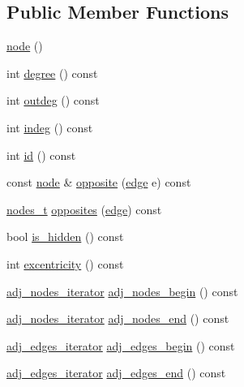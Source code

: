 \subsection*{Public Member Functions}
\begin{DoxyCompactItemize}
\item 
\mbox{\hyperlink{classnode_a6da4ea35f222059db9a59cf40be459f9}{node}} ()
\item 
int \mbox{\hyperlink{classnode_a1e5e94e426da180a069cf307616e38e3}{degree}} () const
\item 
int \mbox{\hyperlink{classnode_a32adc45c4132e2642ccd2233d79ffe67}{outdeg}} () const
\item 
int \mbox{\hyperlink{classnode_a749bfd1316584b96f8c9b0e44ad512f0}{indeg}} () const
\item 
int \mbox{\hyperlink{classnode_a5d38b4152c3cedb235e45de7eb3f4469}{id}} () const
\item 
const \mbox{\hyperlink{classnode}{node}} \& \mbox{\hyperlink{classnode_a13dbd1809a33a5efede64a359e53a363}{opposite}} (\mbox{\hyperlink{classedge}{edge}} e) const
\item 
\mbox{\hyperlink{edge_8h_a22ac17689106ba21a84e7bc54d1199d6}{nodes\+\_\+t}} \mbox{\hyperlink{classnode_a63b5d884763b0ed9a8c2c595d9cf060d}{opposites}} (\mbox{\hyperlink{classedge}{edge}}) const
\item 
bool \mbox{\hyperlink{classnode_af948e15fd00a31e67928c9061acda582}{is\+\_\+hidden}} () const
\item 
int \mbox{\hyperlink{classnode_aba6b3a48e7b951f08ebbbf3275f0ce9a}{excentricity}} () const
\item 
\mbox{\hyperlink{classnode_a392f19ea6dfa344bdf5c4d5a4b25eb8c}{adj\+\_\+nodes\+\_\+iterator}} \mbox{\hyperlink{classnode_a6cd2febf910bc6572c4aecba6278b100}{adj\+\_\+nodes\+\_\+begin}} () const
\item 
\mbox{\hyperlink{classnode_a392f19ea6dfa344bdf5c4d5a4b25eb8c}{adj\+\_\+nodes\+\_\+iterator}} \mbox{\hyperlink{classnode_a2477fa92c56a19d29464082444a3043a}{adj\+\_\+nodes\+\_\+end}} () const
\item 
\mbox{\hyperlink{classnode_abdd49248203010f2d5432dfef22d017a}{adj\+\_\+edges\+\_\+iterator}} \mbox{\hyperlink{classnode_a788d3e932a5c164caa5ec82aa47551b2}{adj\+\_\+edges\+\_\+begin}} () const
\item 
\mbox{\hyperlink{classnode_abdd49248203010f2d5432dfef22d017a}{adj\+\_\+edges\+\_\+iterator}} \mbox{\hyperlink{classnode_aa1e7887d29390297580769454f769ad6}{adj\+\_\+edges\+\_\+end}} () const
\item 

\end{DoxyCompactItemize}
